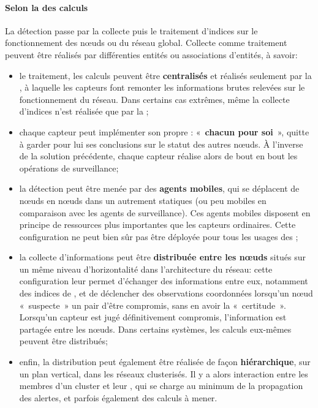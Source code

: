         \paragraph{Selon la  des calculs}
La détection passe par la collecte puis le traitement d'indices sur le fonctionnement des nœuds ou du réseau global.
Collecte comme traitement peuvent être réalisés par différenties entités ou associations d'entités, à savoir:
\begin{itemize}
    \item le traitement, les calculs peuvent être \textbf{centralisés} et réalisés seulement par la \sdb, à laquelle les capteurs font remonter les informations brutes relevées sur le fonctionnement du réseau. Dans certains cas extrêmes, même la collecte d'indices n'est réalisée que par la \sdb;
    \item chaque capteur peut implémenter son propre \ids: « \textbf{chacun pour soi} », quitte à garder pour lui ses conclusions sur le statut des autres nœuds. À l'inverse de la solution précédente, chaque capteur réalise alors de bout en bout les opérations de surveillance;
    \item la détection peut être menée par des \textbf{agents mobiles}, qui se déplacent de nœuds en nœuds dans un \rc autrement statiques (ou peu mobiles en comparaison avec les agents de surveillance). Ces agents mobiles disposent en principe de ressources plus importantes que les capteurs ordinaires. Cette configuration ne peut bien sûr pas être déployée pour tous les usages des \rcs;
    \item la collecte d'informations peut être \textbf{distribuée entre les nœuds} situés sur un même niveau d'horizontalité dans l'architecture du réseau: cette configuration leur permet d'échanger des informations entre eux, notamment des indices de , et de déclencher des observations coordonnées lorsqu'un nœud « suspecte » un pair d'être compromis, sans en avoir la « certitude ». Lorsqu'un capteur est jugé définitivement compromis, l'information est partagée entre les nœuds. Dans certains systèmes, les calculs eux-mêmes peuvent être distribués;
    \item enfin, la distribution peut également être réalisée de façon \textbf{hiérarchique}, sur un plan vertical, dans les réseaux clusterisés. Il y a alors interaction entre les membres d'un cluster et leur \ch, qui se charge au minimum de la propagation des alertes, et parfois également des calculs à mener.
\end{itemize}

